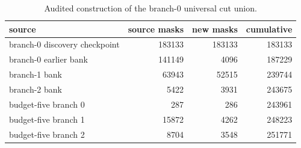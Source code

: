 \begin{table}[t]
\centering
\caption{Audited construction of the branch-0 universal cut union.}
\label{tab:union-sources}
\begin{tabular}{@{}lrrr@{}}
\toprule
source & source masks & new masks & cumulative\\
\midrule
branch-0 discovery checkpoint & 183133 & 183133 & 183133\\
branch-0 earlier bank          & 141149 &   4096 & 187229\\
branch-1 bank                  &  63943 &  52515 & 239744\\
branch-2 bank                  &   5422 &   3931 & 243675\\
budget-five branch 0           &    287 &    286 & 243961\\
budget-five branch 1           &  15872 &   4262 & 248223\\
budget-five branch 2           &   8704 &   3548 & 251771\\
\bottomrule
\end{tabular}
\end{table}
